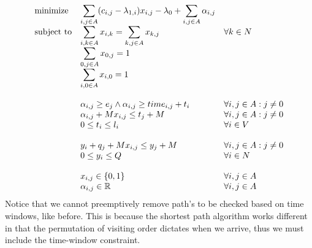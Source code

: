 \documentclass{article}
\begin{document}
    \begin{equation*}
        \begin{array}{ll@{}ll}
            \text{minimize}  & \displaystyle\sum_{i,j \in A} ( c_{i, j} - \lambda_{1,i})x_{i,j} - \lambda_0 + \sum_{i,j \in A} \alpha_{i,j}&&\\
            \text{subject to}& \displaystyle\sum_{i, k \in A}x_{i,k} = \sum_{k, j \in A}x_{k,j} &&\forall k \in N\\
            & \displaystyle\sum_{0,j \in A}x_{0,j} = 1 &&\\
            & \displaystyle\sum_{i,0 \in A}x_{i,0} = 1 &&\\\\
            & \displaystyle\alpha_{i,j} \geq e_j \land \alpha_{i,j} \geq time_{i,j} + t_i &&  \forall i,j \in A: j \neq 0\\
            & \displaystyle \alpha_{i,j} + Mx_{i,j} \leq t_j + M  && \forall i,j \in A: j \neq 0\\
            & \displaystyle0 \leq t_i \leq l_i &&  \forall i \in V\\\\
            & \displaystyle y_i + q_j + M x_{i,j} \leq y_j + M & & \forall i,j \in A : j \neq 0\\
            & \displaystyle 0 \leq y_i \leq Q && \forall i \in N \\\\
            & \displaystyle x_{i,j} \in \{0,1\} && \forall i,j \in A\\
            & \displaystyle \alpha_{i,j} \in \mathbb{R} && \forall i,j \in A
        \end{array}
    \end{equation*}
    Notice that we cannot preemptively remove path's to be checked based on time windows, like before.
    This is because the shortest path algorithm works different in that the permutation of visiting order dictates when we arrive, thus we must include the time-window constraint.

    \clearpage
\end{document}
